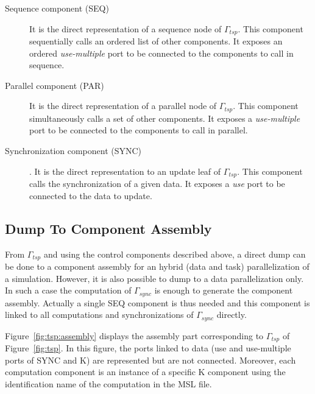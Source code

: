 \begin{description}
\item[Sequence component (SEQ)] It is the direct representation of a sequence node of $\Gamma_{tsp}$. This component sequentially calls an ordered list of other components. It exposes an ordered \emph{use-multiple} port to be connected to the components to call in sequence.

\item[Parallel component (PAR)] It is the direct representation of a parallel node of $\Gamma_{tsp}$. This component simultaneously calls a set of other components. It exposes a \emph{use-multiple} port to be connected to the components to call in parallel.
  
\item[Synchronization component (SYNC)]. It is the direct representation to an update leaf of $\Gamma_{tsp}$. This component calls the synchronization of a given data. It exposes a \emph{use} port to be connected to the data to update.

\end{description}


\subsection{Dump To Component Assembly}
From $\Gamma_{tsp}$ and using the control components described above,
a direct dump can be done to a component assembly for an hybrid (data
and task) parallelization of a simulation. 
However, it is also
possible to dump to a data parallelization only. In such a case the
computation of $\Gamma_{sync}$ is enough to generate the component
assembly. Actually a single SEQ component is thus needed and this
component is linked to all computations and synchronizations of
$\Gamma_{sync}$ directly.

Figure~\ref{fig:tsp:assembly} displays the assembly part corresponding to
$\Gamma_{tsp}$ of Figure~\ref{fig:tsp}. In this figure, the ports
linked to data (use and use-multiple ports of SYNC and K) are
represented but are not connected. Moreover, each computation
component is an instance of a specific K component using
the identification name of the computation in the MSL file.

